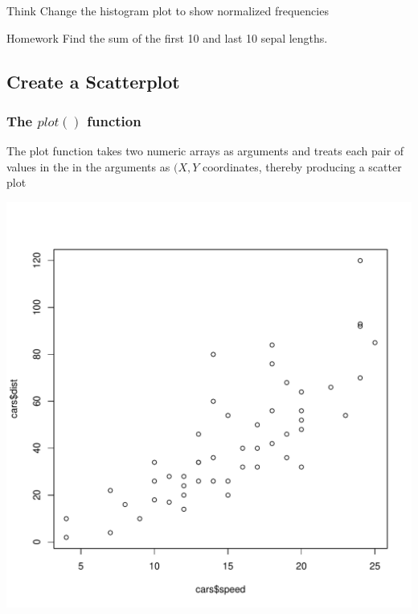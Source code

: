 \begin{DIY}{Think}
Change the histogram plot to show normalized frequencies
\end{DIY}

\begin{DIY}{Homework}
Find the sum of the first 10 and last 10 sepal lengths.
\end{DIY}
\subsection{Create a Scatterplot}
\subsubsection{The $plot()$ function}
\noindent The plot function takes two numeric arrays as arguments and treats each pair of values in the in the arguments as $(X,Y$ coordinates, thereby producing a scatter plot 
\begin{knitrout}
\color{fgcolor}\begin{kframe}
\begin{alltt}
\hlopt{$}\hlopt{$} 
\end{alltt}
\end{kframe}
\includegraphics[width=\maxwidth]{figure/plot-1} 
\begin{kframe}\begin{alltt}
\end{alltt}
\end{kframe}
\end{knitrout}

